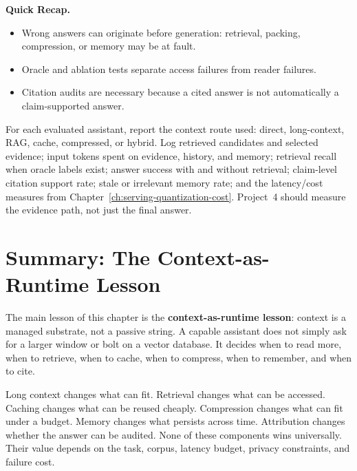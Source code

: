 \begin{quickrecap}
\textbf{Quick Recap.}
\begin{itemize}[nosep,leftmargin=1.5em]
  \item Wrong answers can originate before generation: retrieval, packing, compression, or memory may be at fault.
  \item Oracle and ablation tests separate access failures from reader failures.
  \item Citation audits are necessary because a cited answer is not automatically a claim-supported answer.
\end{itemize}
\end{quickrecap}

\begin{tcolorbox}[colback=orange!5, colframe=orange!60, title=\textbf{For Project~4: Report the Context System}]
For each evaluated assistant, report the context route used: direct, long-context, RAG, cache, compressed, or hybrid. Log retrieved candidates and selected evidence; input tokens spent on evidence, history, and memory; retrieval recall when oracle labels exist; answer success with and without retrieval; claim-level citation support rate; stale or irrelevant memory rate; and the latency/cost measures from Chapter~\ref{ch:serving-quantization-cost}. Project~4 should measure the evidence path, not just the final answer.
\end{tcolorbox}


\section{Summary: The Context-as-Runtime Lesson}
\label{sec:ch20-summary}

The main lesson of this chapter is the \textbf{context-as-runtime lesson}: context is a managed substrate, not a passive string. A capable assistant does not simply ask for a larger window or bolt on a vector database. It decides when to read more, when to retrieve, when to cache, when to compress, when to remember, and when to cite.

Long context changes what can fit. Retrieval changes what can be accessed. Caching changes what can be reused cheaply. Compression changes what can fit under a budget. Memory changes what persists across time. Attribution changes whether the answer can be audited. None of these components wins universally. Their value depends on the task, corpus, latency budget, privacy constraints, and failure cost.

